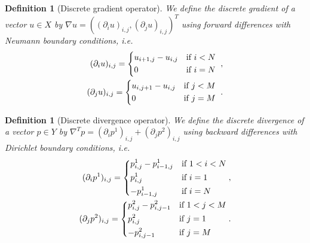 \documentclass[abstracton]{scrreprt}
\newtheorem{definition}[theorem]{Definition}
\begin{document}
        \begin{definition}[Discrete gradient operator] %
        \label{def:discrete_gradient_operator}
            We define the discrete gradient of a vector $u \in X$ by $\nabla u = ((\partial_{i}u)_{i, j}, (\partial_{j}u)_{i, j})^{T}$ using forward differences with Neumann boundary conditions, i.e.
                \begin{eqnarray}
                    (\partial_{i}u)_{i, j} =
                        \begin{dcases*}
                            u_{i+1, j} - u_{i, j} & \textnormal{if $i < N$}\\
                            0 & \textnormal{if $i = N$}
                        \end{dcases*}, \notag \\
                    (\partial_{j}u)_{i, j} =
                        \begin{dcases*}
                            u_{i, j+1} - u_{i, j} & \textnormal{if $j < M$}\\
                            0 & \textnormal{if $j = M$}
                        \end{dcases*}. \notag
                \end{eqnarray}
        \end{definition}
        \begin{definition}[Discrete divergence operator] %
        \label{def:discrete_divergence_operator}
            We define the discrete divergence of a vector $p \in Y$ by $\nabla^{T} p = (\partial_{i}p^{1})_{i, j} + (\partial_{j}p^{2})_{i, j}$ using backward differences with Dirichlet boundary conditions, i.e.
                \begin{eqnarray}
                    (\partial_{i}p^{1})_{i, j} =
                        \begin{dcases*}
                            p^{1}_{i, j} - p^{1}_{i-1, j} & \textnormal{if $1 < i < N$}\\
                            p^{1}_{i, j} & \textnormal{if $i = 1$}\\
                            -p^{1}_{i-1, j} & \textnormal{if $i = N$}
                        \end{dcases*}, \notag \\
                    (\partial_{j}p^{2})_{i, j} =
                        \begin{dcases*}
                            p^{2}_{i, j} - p^{2}_{i, j-1} & \textnormal{if $1 < j < M$}\\
                            p^{2}_{i, j} & \textnormal{if $j = 1$}\\
                            -p^{2}_{i, j-1} & \textnormal{if $j = M$}
                        \end{dcases*}. \notag
                \end{eqnarray}
        \end{definition}
\end{document}
